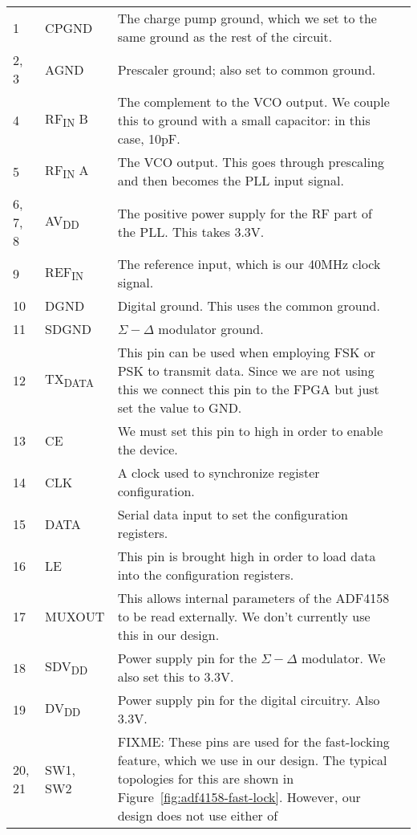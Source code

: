 \begin{tabularx}{\textwidth}{l l X>{\raggedright\arraybackslash}X}
        1 & CPGND & The charge pump ground, which we set to the same ground as the rest of the circuit. \\
        2, 3 & AGND & Prescaler ground; also set to common ground. \\
        4 & RF\textsubscript{IN} B & The complement to the VCO output. We couple this to ground with a
        small capacitor: in this case, 10pF. \\
        5 & RF\textsubscript{IN} A & The VCO output. This goes through prescaling and then becomes the PLL
        input signal. \\
        6, 7, 8 & AV\textsubscript{DD} & The positive power supply for the RF part of the PLL. This takes
        3.3V. \\
        9 & REF\textsubscript{IN} & The reference input, which is our 40MHz clock signal. \\
        10 & DGND & Digital ground. This uses the common ground. \\
        11 & SDGND & $\Sigma-\Delta$ modulator ground. \\
        12 & TX\textsubscript{DATA} & This pin can be used when employing FSK or PSK to transmit
        data. Since we are not using this we connect this pin to the FPGA
        but just set the value to GND. \\
        13 & CE & We must set this pin to high in order to enable the device. \\
        14 & CLK & A clock used to synchronize register configuration. \\
        15 & DATA & Serial data input to set the configuration registers. \\
        16 & LE & This pin is brought high in order to load data into the configuration registers. \\
        17 & MUXOUT & This allows internal parameters of the ADF4158 to be read externally. We don't
        currently use this in our design. \\
        18 & SDV\textsubscript{DD} & Power supply pin for the $\Sigma-\Delta$ modulator. We also set this
        to 3.3V. \\
        19 & DV\textsubscript{DD} & Power supply pin for the digital circuitry. Also 3.3V. \\
        20, 21 & SW1, SW2 & FIXME: These pins are used for the fast-locking feature, which we use in our
        design. The typical topologies for this are shown in
        Figure~\ref{fig:adf4158-fast-lock}. However, our design does not use either of

\end{tabularx}
